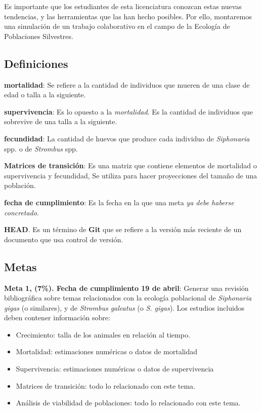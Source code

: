 \documentclass[12pt,letterpaper,]{book}
\begin{document}
Es importante que los estudiantes de esta licenciatura conozcan estas
nuevas tendencias, y las herramientas que las han hecho posibles. Por
ello, montaremos una simulación de un trabajo colaborativo en el campo
de la Ecología de Poblaciones Silvestres.

\subsection{Definiciones}\label{definiciones}

\textbf{mortalidad}: Se refiere a la cantidad de individuos que mueren
de una clase de edad o talla a la siguiente.

\textbf{supervivencia}: Es lo opuesto a la \emph{mortalidad}. Es la
cantidad de individuos que sobrevive de una talla a la siguiente.

\textbf{fecundidad}: La cantidad de huevos que produce cada individuo de
\emph{Siphonaria} spp. o de \emph{Strombus} spp.

\textbf{Matrices de transición}: Es una matriz que contiene elementos de
mortalidad o supervivencia y fecundidad, Se utiliza para hacer
proyecciones del tamaño de una población.

\textbf{fecha de cumplimiento}: Es la fecha en la que una meta \emph{ya
debe haberse concretado}.

\textbf{HEAD}. Es un término de \textbf{Git} que se refiere a la versión
más reciente de un documento que usa control de versión.

\subsection{Metas}\label{metas}

\textbf{Meta 1, (7\%). Fecha de cumplimiento 19 de abril}: Generar una
revisión bibliográfica sobre temas relacionados con la ecología
poblacional de \emph{Siphonaria gigas} (o similares), y de
\emph{Strombus galeatus} (o \emph{S. gigas}). Los estudios incluidos
deben contener información sobre:

\begin{itemize}
\item
  Crecimiento: talla de los animales en relación al tiempo.
\item
  Mortalidad: estimaciones numéricas o datos de mortalidad
\item
  Supervivencia: estimaciones numéricas o datos de supervivencia
\item
  Matrices de transición: todo lo relacionado con este tema.
\item
  Análisis de viabilidad de poblaciones: todo lo relacionado con este
  tema.
\end{itemize}
\end{document}
